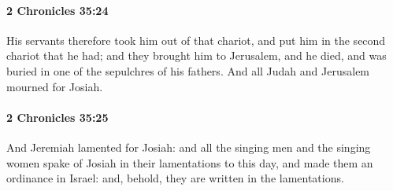 		\paragraph{2 Chronicles 35:24} %
			\label{2CHRONICLES-35-24}

			His servants therefore took him out of that chariot, and put him in the second chariot that he had; and they brought him to Jerusalem, and he died, and was buried in one of the sepulchres of his fathers. And all Judah and Jerusalem mourned for Josiah.


		\paragraph{2 Chronicles 35:25} %
			\label{2CHRONICLES-35-25}

			And Jeremiah lamented for Josiah: and all the singing men and the singing women spake of Josiah in their lamentations to this day, and made them an ordinance in Israel: and, behold, they are written in the lamentations.

